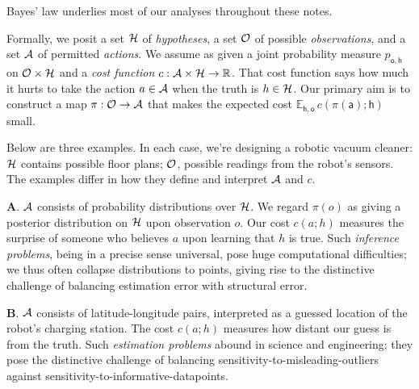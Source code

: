 \documentclass[11pt, justified]{tufte-book}
\newcommand{\Ee}{\mathbb{E}}\newcommand{\eE}{\mathcal{E}}
\newcommand{\Rr}{\mathbb{R}}\newcommand{\rR}{\mathcal{R}}
\newcommand{\sfa}{\mathsf{a}}\newcommand{\fra}{\mathcal{a}}
\newcommand{\sfh}{\mathsf{h}}\newcommand{\frh}{\mathcal{h}}
\newcommand{\sfo}{\mathsf{o}}\newcommand{\fro}{\mathcal{o}}
\theoremstyle{definition}
\begin{document}
      Bayes' law underlies most of our analyses throughout these
      notes.

      Formally, we posit a set $\mathcal{H}$ of \emph{hypotheses}, a set $\mathcal{O}$ of
      possible \emph{observations}, and a set $\mathcal{A}$ of permitted
      \emph{actions}.  We assume as given a joint probability measure
      $p_{\sfo,\sfh}$ on $\mathcal{O}\times \mathcal{H}$ and a \emph{cost function}
      $c:\aA\times \hH \to \Rr$.
      That cost function says how much it hurts to take the action $a\in \mathcal{A}$
      when the truth is $h\in \mathcal{H}$.
      Our primary aim is to construct a map $\pi:\mathcal{O}\to \mathcal{A}$ that makes the
      expected cost $\Ee_{\sfh,\sfo} \, c(\pi(\sfa); \sfh)$ small.

      Below are three examples.  In each case, we're designing a robotic vacuum
      cleaner: $\mathcal{H}$ contains possible floor plans; $\mathcal{O}$, 
      possible readings from the robot's sensors.  The examples differ in how
      they define and interpret $\mathcal{A}$ and $c$.

      \textbf{A}.  $\mathcal{A}$ consists of probability distributions over $\mathcal{H}$. We
      regard $\pi(o)$ as giving a posterior distribution on $\mathcal{H}$ upon
      observation $o$.  Our cost $c(a;h)$ measures the surprise of someone who
      believes $a$ upon learning that $h$ is true. 
      Such \emph{inference problems}, being in a precise sense universal, pose
      huge computational difficulties; we thus often collapse distributions to
      points, giving rise to the distinctive challenge of balancing estimation
      error with structural error.

      \textbf{B}.
      $\mathcal{A}$ consists of latitude-longitude pairs, interpreted as a guessed
      location of the robot's charging station.  The cost $c(a;h)$ measures how
      distant our guess is from the truth.  
      Such \emph{estimation problems} abound in science and engineering; they
      pose the distinctive challenge of balancing
      sensitivity-to-misleading-outliers against
      sensitivity-to-informative-datapoints.
\end{document}
